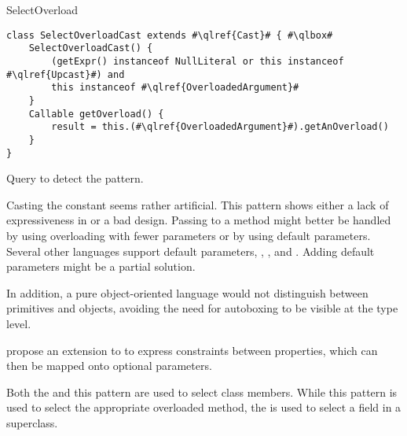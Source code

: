 \begin{pattern}{SelectOverload}
\begin{listing}
\begin{verbatim}
class SelectOverloadCast extends #\qlref{Cast}# { #\qlbox#
	SelectOverloadCast() {
		(getExpr() instanceof NullLiteral or this instanceof #\qlref{Upcast}#) and
		this instanceof #\qlref{OverloadedArgument}#
	}
	Callable getOverload() {
		result = this.(#\qlref{OverloadedArgument}#).getAnOverload()
	}
}
\end{verbatim}
\caption{Query to detect the \thisp{} pattern.}
\label{lst:ql:SelectOverloadCast}
\end{listing}

\issues{}
Casting the  constant seems rather artificial.
This pattern shows either a lack of expressiveness in \java{} or a bad \api{} design.
Passing  to a method might better be handled by using overloading with fewer parameters or by using default parameters.
Several other languages support default parameters,
\eg{}, \scala{}, \csharp{} and \cpp{}.
Adding default parameters might be a partial solution.

In addition,
a pure object-oriented language would not distinguish between primitives and objects,
avoiding the need for autoboxing to be visible at the type level.

\cite{oostvogelsStaticTypingComplex2018a} propose an extension to \typescript{} to express constraints between properties,
which can then be mapped onto optional parameters.

Both the  and this pattern are used to select class members.
While this pattern is used to select the appropriate overloaded method,
the  is used to select a field in a superclass.

\end{pattern}
